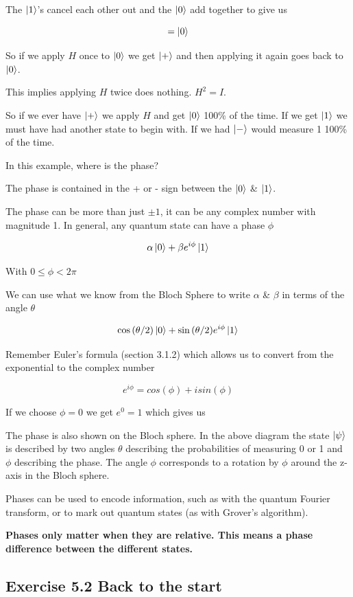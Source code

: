 \documentclass{book}
\begin{document}
The $\ket{1}$'s cancel each other out and the $\ket{0}$ add together to give us

$$ = \ket{0} $$

So if we apply $H$ once to $\ket{0}$ we get $\ket{+}$ and then applying it again goes back to $\ket{0}$. 

This implies applying $H$ twice does nothing. $H^2 = I$.

So if we ever have $\ket{+}$ we apply $H$ and get $\ket{0}$ 100\% of the time. If we get $\ket{1}$ we must have had another state to begin with. If we had $\ket{-}$ would measure 1 100\% of the time. 

In this example, where is the phase? 

The phase is contained in the + or - sign between the $\ket{0}$ \& $\ket{1}$. 

The phase can be more than just $\pm 1$, it can be any complex number with magnitude 1. In general, any quantum state can have a phase $\phi$ 

$$ \alpha\ket{0} + \beta e^{i\phi}\ket{1} $$

With $ 0 \leq \phi < 2\pi $

We can use what we know from the Bloch Sphere to write $\alpha$ \& $\beta$ in terms of the angle $\theta$


$$ \cos{(\theta/2)}\ket{0} + \sin{(\theta/2)} e^{i\phi}\ket{1} $$


Remember Euler's formula (section 3.1.2) which allows us to convert from the exponential to the complex number

$$ e^{i \phi} = cos(\phi) + i sin(\phi) $$

If we choose $\phi = 0$ we get $e^0 = 1$ which gives us 

The phase is also shown on the Bloch sphere. In the above diagram the state $\ket{\psi}$ is described by two angles $\theta$ describing the probabilities of measuring 0 or 1 and $\phi$ describing the phase. The angle $\phi$ corresponds to a rotation by $\phi$ around the z-axis in the Bloch sphere.  

Phases can be used to encode information, such as with the quantum Fourier transform, or to mark out quantum states (as with Grover's algorithm). 

\textbf{Phases only matter when they are relative. This means a phase difference between the different states.} 

\hline

\subsection{Exercise 5.2 Back to the start}
\end{document}
